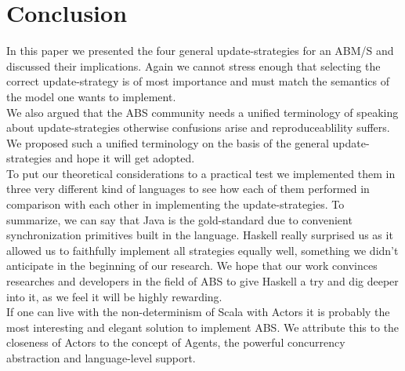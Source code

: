 \section{Conclusion}
In this paper we presented the four general update-strategies for an ABM/S and discussed their implications. Again we cannot stress enough that selecting the correct update-strategy is of most importance and must match the semantics of the model one wants to implement. \\
We also argued that the ABS community needs a unified terminology of speaking about update-strategies otherwise confusions arise and reproduceablility suffers. We proposed such a unified terminology on the basis of the general update-strategies and hope it will get adopted. \\
To put our theoretical considerations to a practical test we implemented them in three very different kind of languages to see how each of them performed in comparison with each other in implementing the update-strategies. To summarize, we can say that Java is the gold-standard due to convenient synchronization primitives built in the language. Haskell really surprised us as it allowed us to faithfully implement all strategies equally well, something we didn't anticipate in the beginning of our research. We hope that our work convinces researches and developers in the field of ABS to give Haskell a try and dig deeper into it, as we feel it will be highly rewarding. \\
If one can live with the non-determinism of Scala with Actors it is probably the most interesting and elegant solution to implement ABS. We attribute this to the closeness of Actors to the concept of Agents, the powerful concurrency abstraction and language-level support.